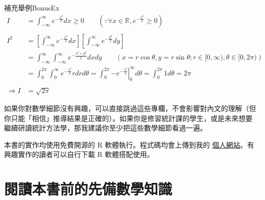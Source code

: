 \begin{bonus}{補充舉例}{BonusEx}
    \begin{align*}
    I &= \int_{-\infty}^{\infty} e^{-\frac{x^2}{2}} dx \ge 0 \quad\quad 
         (\because \forall x \in \mathbb{R},  e^{-\frac{x^2}{2}} \ge 0)\\\\
    I^2 &= \left[ \int_{-\infty}^{\infty} e^{-\frac{x^2}{2}} dx \right]
           \left[ \int_{-\infty}^{\infty} e^{-\frac{y^2}{2}} dy \right]\\
    &= \int_{-\infty}^{\infty} \int_{-\infty}^{\infty} e^{-\frac{x^2+y^2}{2}} dx dy \quad\quad
       \left( x = r \cos \theta, y = r \sin \theta; 
       r \in [0, \infty), \theta \in [0, 2\pi) \right)\\
    &= \int_{0}^{2\pi} \int_{0}^{\infty} e^{-\frac{r^2}{2}} r dr d\theta
      =\int_{0}^{2\pi} \left. -e^{-\frac{r^2}{2}} \right|_{0}^{\infty} d\theta 
      =\int_{0}^{2\pi} 1 d\theta = 2\pi\\\\
    \Rightarrow I &= \sqrt{2\pi}
    \end{align*}
\end{bonus}

如果你對數學細節沒有興趣，可以直接跳過這些專欄，不會影響對內文的理解（但你只能「相信」推導結果是正確的）。如果你是修習統計課的學生，或是未來想要繼續研讀統計方法學，那我建議你至少把這些數學細節看過一遍。

本書的實作均使用免費開源的 R 軟體執行。程式碼均會上傳到我的 \href{http://mcshih.com}{個人網站}。有興趣實作的讀者可以自行下載 R 軟體搭配使用。

\section{閱讀本書前的先備數學知識}
